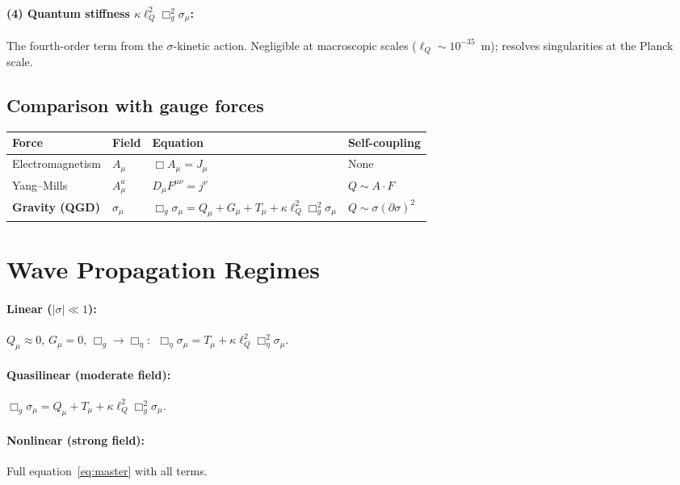 \documentclass[11pt,a4paper]{article}
\theoremstyle{plain}
\theoremstyle{definition}
\theoremstyle{remark}
\newcommand{\lQ}{\ell_Q}
\begin{document}
\paragraph{(4) Quantum stiffness $\kappa\lQ^2\Box_g^2\sigma_\mu$:}
The fourth-order term from the $\sigma$-kinetic action.  Negligible at macroscopic scales ($\lQ \sim 10^{-35}$~m); resolves singularities at the Planck scale.

\subsection{Comparison with gauge forces}

\begin{table}[h]
  \centering
  \begin{tabular}{@{}llll@{}}
    \toprule
    Force & Field & Equation & Self-coupling \\
    \midrule
    Electromagnetism & $A_\mu$ & $\Box A_\mu = J_\mu$ & None \\
    Yang--Mills & $A_\mu^a$ & $D_\mu F^{\mu\nu} = j^\nu$ & $Q \sim A \cdot F$ \\
    \textbf{Gravity (QGD)} & $\sigma_\mu$ & $\Box_g\sigma_\mu = Q_\mu + G_\mu + T_\mu + \kappa\lQ^2\Box_g^2\sigma_\mu$ & $Q \sim \sigma(\partial\sigma)^2$ \\
    \bottomrule
  \end{tabular}
\end{table}

\section{Wave Propagation Regimes}
\label{sec:regimes}

\paragraph{Linear ($|\sigma| \ll 1$):} $Q_\mu \approx 0$, $G_\mu = 0$, $\Box_g \to \Box_\eta$:
$\;\Box_\eta\sigma_\mu = T_\mu + \kappa\lQ^2\Box_\eta^2\sigma_\mu$.

\paragraph{Quasilinear (moderate field):}
$\Box_g\sigma_\mu = Q_\mu + T_\mu + \kappa\lQ^2\Box_g^2\sigma_\mu$.

\paragraph{Nonlinear (strong field):} Full equation~\eqref{eq:master} with all terms.
\end{document}
